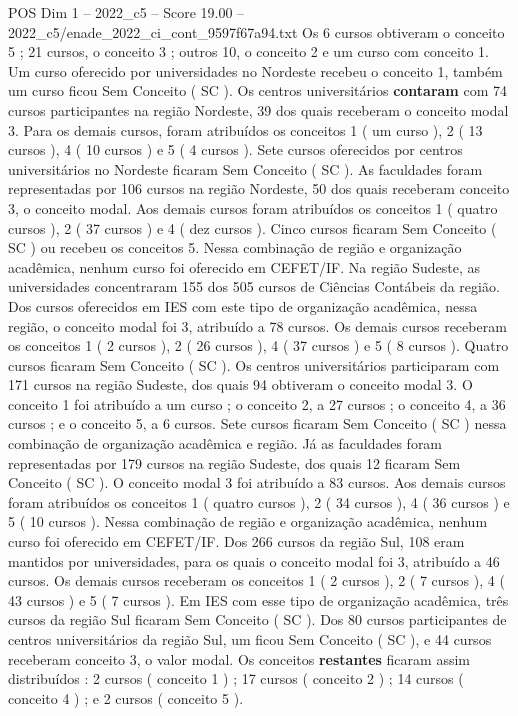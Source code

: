 \begin{textsample}{POS Dim 1 – 2022\_c5 – Score 19.00 – 2022\_c5/enade\_2022\_ci\_cont\_9597f67a94.txt}
Os 6 cursos obtiveram o conceito 5 ; 21 cursos, o conceito 3 ; outros 10, o conceito 2 e um curso com conceito 1.
Um curso oferecido por universidades no Nordeste recebeu o conceito 1, também um curso ficou Sem Conceito ( SC ).
Os centros universitários \textbf{contaram} com 74 cursos participantes na região Nordeste, 39 dos quais receberam o conceito modal 3.
Para os demais cursos, foram atribuídos os conceitos 1 ( um curso ), 2 ( 13 cursos ), 4 ( 10 cursos ) e 5 ( 4 cursos ).
Sete cursos oferecidos por centros universitários no Nordeste ficaram Sem Conceito ( SC ).
As faculdades foram representadas por 106 cursos na região Nordeste, 50 dos quais receberam conceito 3, o conceito modal.
Aos demais cursos foram atribuídos os conceitos 1 ( quatro cursos ), 2 ( 37 cursos ) e 4 ( dez cursos ).
Cinco cursos ficaram Sem Conceito ( SC ) ou recebeu os conceitos 5.
Nessa combinação de região e organização acadêmica, nenhum curso foi oferecido em CEFET/IF.
Na região Sudeste, as universidades concentraram 155 dos 505 cursos de Ciências Contábeis da região.
Dos cursos oferecidos em IES com este tipo de organização acadêmica, nessa região, o conceito modal foi 3, atribuído a 78 cursos.
Os demais cursos receberam os conceitos 1 ( 2 cursos ), 2 ( 26 cursos ), 4 ( 37 cursos ) e 5 ( 8 cursos ).
Quatro cursos ficaram Sem Conceito ( SC ).
Os centros universitários participaram com 171 cursos na região Sudeste, dos quais 94 obtiveram o conceito modal 3.
O conceito 1 foi atribuído a um curso ; o conceito 2, a 27 cursos ; o conceito 4, a 36 cursos ; e o conceito 5, a 6 cursos.
Sete cursos ficaram Sem Conceito ( SC ) nessa combinação de organização acadêmica e região.
Já as faculdades foram representadas por 179 cursos na região Sudeste, dos quais 12 ficaram Sem Conceito ( SC ).
O conceito modal 3 foi atribuído a 83 cursos.
Aos demais cursos foram atribuídos os conceitos 1 ( quatro cursos ), 2 ( 34 cursos ), 4 ( 36 cursos ) e 5 ( 10 cursos ).
Nessa combinação de região e organização acadêmica, nenhum curso foi oferecido em CEFET/IF.
Dos 266 cursos da região Sul, 108 eram mantidos por universidades, para os quais o conceito modal foi 3, atribuído a 46 cursos.
Os demais cursos receberam os conceitos 1 ( 2 cursos ), 2 ( 7 cursos ), 4 ( 43 cursos ) e 5 ( 7 cursos ).
Em IES com esse tipo de organização acadêmica, três cursos da região Sul ficaram Sem Conceito ( SC ).
Dos 80 cursos participantes de centros universitários da região Sul, um ficou Sem Conceito ( SC ), e 44 cursos receberam conceito 3, o valor modal.
Os conceitos \textbf{restantes} ficaram assim distribuídos : 2 cursos ( conceito 1 ) ; 17 cursos ( conceito 2 ) ; 14 cursos ( conceito 4 ) ; e 2 cursos ( conceito 5 ).

\end{textsample}
